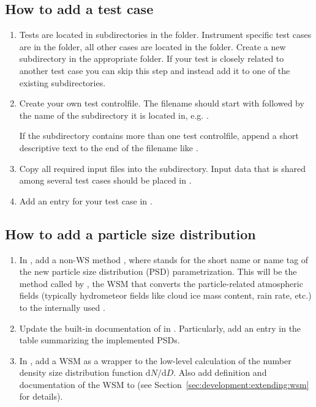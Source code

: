 \subsection{How to add a test case}
\begin{enumerate}
\item Tests are located in subdirectories in the 
  folder. Instrument specific test cases are in the
   folder, all other cases are
  located in the  folder. Create
  a new subdirectory in the appropriate folder. If your test is closely
  related to another test case you can skip this step and instead add it
  to one of the existing subdirectories.
\item Create your own test controlfile. The filename should start
  with  followed by the name
  of the subdirectory it is located in, e.g.
  .

  If the subdirectory contains more than one test controlfile,
  append a short descriptive text to the end of the filename like
  .
\item Copy all required input files into the subdirectory. Input data that is
  shared among several test cases should be placed in
  .
\item Add an entry for your test case in
  .
\end{enumerate}


\subsection{How to add a particle size distribution}
\begin{enumerate}
\item In , add a non-WS method
, where  stands for the short
name or name tag of the new particle size distribution (PSD) parametrization.
This will be the method called by
, the WSM that converts the
particle-related atmospheric fields (typically hydrometeor fields like cloud ice
mass content, rain rate, etc.) to the internally used .
\item Update the built-in documentation of
 in .
Particularly, add an entry in the table summarizing the implemented PSDs.
\item In , add a WSM  as a
wrapper to the low-level calculation of the number density size distribution
function $\mathrm{d}N/\mathrm{d}D$. Also add definition and documentation of
the WSM to  (see
Section~\ref{sec:development:extending:wsm} for details).
\end{enumerate}

